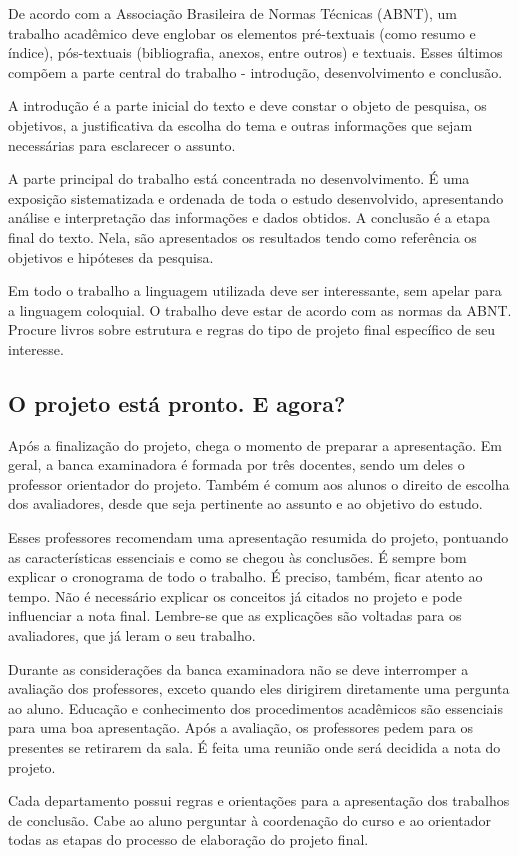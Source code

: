 De acordo com a Associação Brasileira de Normas Técnicas (ABNT), um trabalho acadêmico deve englobar os elementos pré-textuais (como resumo e índice), pós-textuais (bibliografia, anexos, entre outros) e textuais. Esses últimos compõem a parte central do trabalho - introdução, desenvolvimento e conclusão.

A introdução é a parte inicial do texto e deve constar o objeto de pesquisa, os objetivos, a justificativa da escolha do tema e outras informações que sejam necessárias para esclarecer o assunto.

A parte principal do trabalho está concentrada no desenvolvimento. É uma exposição sistematizada e ordenada de toda o estudo desenvolvido, apresentando análise e interpretação das informações e dados obtidos. A conclusão é a etapa final do texto. Nela, são apresentados os resultados tendo como referência os objetivos e hipóteses da pesquisa.

Em todo o trabalho a linguagem utilizada deve ser interessante, sem apelar para a linguagem coloquial. O trabalho deve estar de acordo com as normas da ABNT. Procure livros sobre estrutura e regras do tipo de projeto final específico de seu interesse.

\subsection{O projeto está pronto. E agora?}
Após a finalização do projeto, chega o momento de preparar a apresentação. Em geral, a banca examinadora é formada por três docentes, sendo um deles o professor orientador do projeto. Também é comum aos alunos o direito de escolha dos avaliadores, desde que seja pertinente ao assunto e ao objetivo do estudo.

Esses professores recomendam uma apresentação resumida do projeto, pontuando as características essenciais e como se chegou às conclusões. É sempre bom explicar o cronograma de todo o trabalho. É preciso, também, ficar atento ao tempo. Não é necessário explicar os conceitos já citados no projeto e pode influenciar a nota final. Lembre-se que as explicações são voltadas para os avaliadores, que já leram o seu trabalho.

Durante as considerações da banca examinadora não se deve interromper a avaliação dos professores, exceto quando eles dirigirem diretamente uma pergunta ao aluno. Educação e conhecimento dos procedimentos acadêmicos são essenciais para uma boa apresentação. Após a avaliação, os professores pedem para os presentes se retirarem da sala. É feita uma reunião onde será decidida a nota do projeto.

Cada departamento possui regras e orientações para a apresentação dos trabalhos de conclusão. Cabe ao aluno perguntar à coordenação do curso e ao orientador todas as etapas do processo de elaboração do projeto final.

\selectfont%